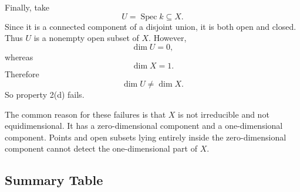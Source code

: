 \documentclass[12pt,a4paper]{article}
\DeclareMathOperator{\Spec}{Spec}
\providecommand{\Spec}{\operatorname{Spec}}
\theoremstyle{notespace}
\begin{document}
Finally, take
\[
U=\Spec k\subseteq X.
\]
Since it is a connected component of a disjoint union, it is both open and closed. Thus \(U\) is a nonempty open subset of \(X\). However,
\[
\dim U=0,
\]
whereas
\[
\dim X=1.
\]
Therefore
\[
\dim U\neq \dim X.
\]
So property 2(d) fails.

The common reason for these failures is that \(X\) is not irreducible and not equidimensional. It has a zero-dimensional component and a one-dimensional component. Points and open subsets lying entirely inside the zero-dimensional component cannot detect the one-dimensional part of \(X\).

\subsection{Summary Table}
\end{document}
